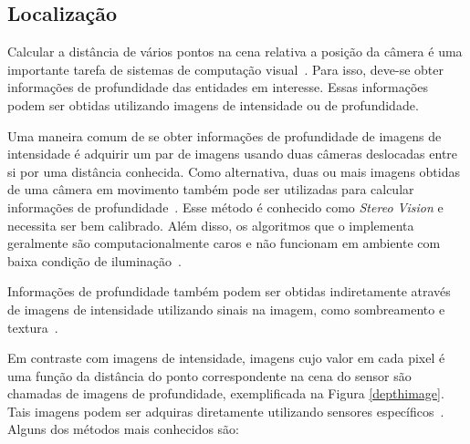 \subsection{Localização}
\label{sec:luz-estruturada}

	Calcular a distância de vários pontos na cena relativa a posição da câmera é uma importante tarefa de sistemas de computação visual~\cite{jain}. Para isso, deve-se obter informações de profundidade das entidades em interesse. Essas informações podem ser obtidas utilizando imagens de intensidade ou de profundidade.

	Uma maneira comum de se obter informações de profundidade de imagens de intensidade é adquirir um par de imagens usando duas câmeras deslocadas entre si por uma distância conhecida. Como alternativa, duas ou mais imagens obtidas de uma câmera em movimento também pode ser utilizadas para calcular informações de profundidade~\cite{jain}. Esse método é conhecido como \textit{Stereo Vision} e necessita ser bem calibrado.  Além disso, os algoritmos que o implementa geralmente são computacionalmente caros e não funcionam em ambiente com baixa condição de iluminação~\cite{fall-detection}.

	Informações de profundidade também podem ser obtidas indiretamente através de imagens de intensidade utilizando sinais na imagem, como sombreamento e textura~\cite{jain}.

	Em contraste com imagens de intensidade, imagens cujo valor em cada pixel é uma função da distância do ponto correspondente na cena do sensor são chamadas de imagens de profundidade, exemplificada na Figura \ref{depthimage}. Tais imagens podem ser adquiras diretamente utilizando sensores específicos~\cite{jain}. Alguns dos métodos mais conhecidos são:


